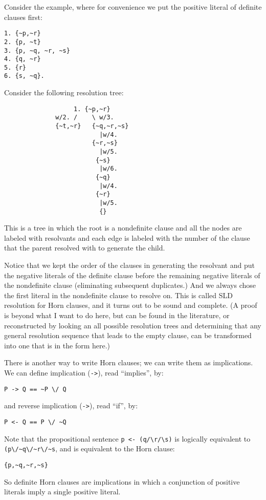 Consider the example, where for convenience we put the positive
literal of definite clauses first:
\begin{verbatim}
1. {~p,~r}
2. {p, ~t}
3. {p, ~q, ~r, ~s}
4. {q, ~r}
5. {r}
6. {s, ~q}.
\end{verbatim}

Consider the following resolution tree:
\begin{verbatim}
                   1. {~p,~r}
              w/2. /    \ w/3.               
              {~t,~r}   {~q,~r,~s}
                          |w/4.
                        {~r,~s}
                          |w/5.
                         {~s}
                          |w/6.
                         {~q}
                          |w/4.
                         {~r}
                          |w/5.
                          {}
\end{verbatim}
This is a tree in which the root is a nondefinite clause and all the
nodes are labeled with resolvants and each edge is labeled with the
number of the clause that the parent resolved with to generate the
child.

Notice that we kept the order of the clauses in generating the
resolvant and put the negative literals of the definite clause before
the remaining negative literals of the nondefinite clause (eliminating
subsequent duplicates.)  And we always chose the first literal in the
nondefinite clause to resolve on.  This is called SLD resolution for
Horn clauses, and it turns out to be sound and complete.  (A proof is
beyond what I want to do here, but can be found in the literature, or
reconstructed by looking an all possible resolution trees and
determining that any general resolution sequence that leads to the
empty clause, can be transformed into one that is in the form here.)

There is another way to write Horn clauses; we can write them as
implications.  We can define implication (\verb|->|), read
``implies'', by:
\begin{verbatim}
P -> Q == ~P \/ Q
\end{verbatim}
and reverse implication
(\verb|->|), read ``if'', by:
\begin{verbatim}
P <- Q == P \/ ~Q
\end{verbatim}
Note that the propositional sentence \verb|p <- (q/\r/\s)| is
logically equivalent to \verb|(p\/~q\/~r\/~s|, and is equivalent to
the Horn clause:
\begin{verbatim}
{p,~q,~r,~s}
\end{verbatim}
So definite Horn clauses are implications in which a conjunction of
positive literals imply a single positive literal.

